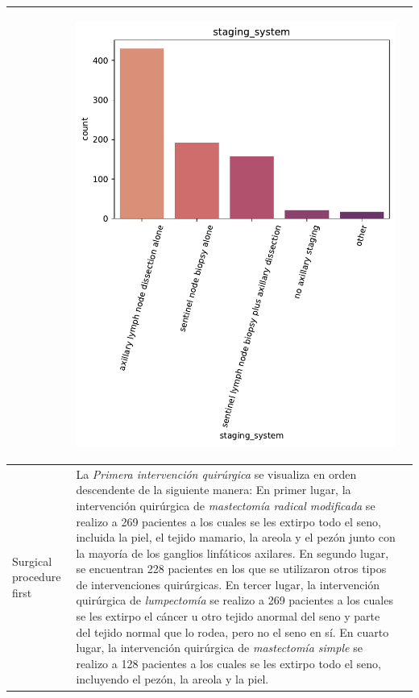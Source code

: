 \begin{table}[!htb]
\begin{threeparttable}
\begin{tabular}{p{2.5cm} p{7cm} p{6.5cm}}
			& \begin{center}\includegraphics[width=1\linewidth]{NOTEBOOK/IMAGENES_DESCRIPTIVAS/40_staging_system}\end{center}
			\\ \hline
			
			Surgical procedure first
			& La \textit{Primera intervención quirúrgica} se visualiza en orden descendente de la siguiente manera: En primer lugar, la intervención quirúrgica de \textit{mastectomía radical modificada} se realizo a 269 pacientes a los cuales se les extirpo todo el seno, incluida la piel, el tejido mamario, la areola y el pezón junto con la mayoría de los ganglios linfáticos axilares. En segundo lugar, se encuentran 228 pacientes en los que se utilizaron otros tipos de intervenciones quirúrgicas. En tercer lugar, la intervención quirúrgica de \textit{lumpectomía} se realizo a 269 pacientes a los cuales se les extirpo el cáncer u otro tejido anormal del seno y parte del tejido normal que lo rodea, pero no el seno en sí. En cuarto lugar, la intervención quirúrgica de \textit{mastectomía simple} se realizo a 128 pacientes a los cuales se les extirpo todo el seno, incluyendo el pezón, la areola y la piel.
			

\end{tabular}
\end{threeparttable}
\end{table}
